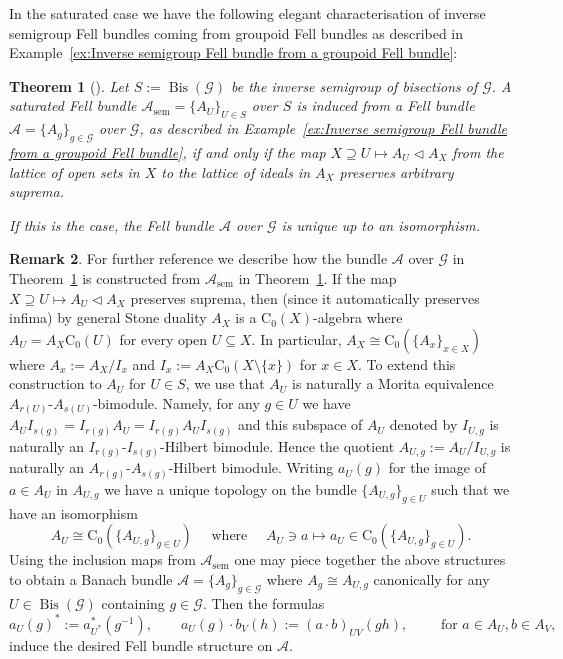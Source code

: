 \documentclass[11 pt, leqno]{amsart}
\numberwithin{equation}{section}
\theoremstyle{plain}
\newtheorem{thm}{Theorem}[section]
\theoremstyle{definition}
\newtheorem {rem} [thm]{Remark}
\newcommand*{\contz}{\mathrm{C_0}}%
\renewcommand{\star}{*}
\DeclareMathOperator{\sem}{sem}
\DeclareMathOperator{\Bis}{Bis}
\newcommand{\G}{\mathcal G} %
\newcommand{\A}{\mathcal A}
\begin{document}
In the saturated case we have the following elegant characterisation of inverse semigroup Fell bundles coming from groupoid Fell bundles as described in Example~\ref{ex:Inverse semigroup Fell bundle from a groupoid Fell bundle}:

\begin{thm}[{\cite[Theorem 6.1]{BussMeyer}}] \label{thm:groupoid_Fell_bundle_from_inverse_semigroup_Fell_bundle}
Let $S:=\Bis(\G)$ be the inverse semigroup of bisections of $\G$.
A saturated Fell bundle $\A_{\sem}=\{A_U\}_{U\in S}$ over $S$ is induced from a Fell bundle $\A=\{A_{g}\}_{g\in \G}$ over $\G$, as described in Example~\ref{ex:Inverse semigroup Fell bundle from a groupoid Fell bundle}, if and only if the map $X\supseteq U\mapsto A_{U} \triangleleft A_X$ from the lattice of open sets in $X$ to the lattice  of ideals in $A_X$ preserves arbitrary suprema.

If this is the case, the Fell bundle $\A$ over $\G$ is unique up to an isomorphism.
\end{thm}

\begin{rem}\label{rem:Buss_Meyer_theorem_bundle_description} 
For further reference we describe how the bundle $\A$ over $\G$ in Theorem~\ref{thm:groupoid_Fell_bundle_from_inverse_semigroup_Fell_bundle} is constructed from $\A_{\sem}$ in Theorem~\ref{thm:groupoid_Fell_bundle_from_inverse_semigroup_Fell_bundle}. 
If the map $X\supseteq U\mapsto A_{U} \triangleleft A_X$ preserves suprema, then (since it automatically preserves infima) by general Stone duality $A_X$ is a $\contz(X)$-algebra where $A_U= A_X \contz(U)$ for every open $U\subseteq X$.
In particular, $A_X\cong \contz(\{A_x\}_{x\in X})$ where $A_x:=A_X/I_x$ and  $I_x:=A_X \contz(X\setminus \{x\})$ for $x\in X$.
To extend this construction to  $A_U$ for $U\in S$, we use that $A_U$ is naturally a Morita equivalence $A_{r(U)}$-$A_{s(U)}$-bimodule. 
Namely, for any $g\in U$ we have $A_{U}I_{ s(g)}=I_{r(g)}A_{U}=I_{r(g)}A_{U}I_{ s(g)}$ and this subspace of $A_{U}$ denoted by $I_{U,g}$ is naturally an $I_{r(g)}$-$I_{s(g)}$-Hilbert bimodule.
Hence  the quotient $A_{U,g}:=A_{U}/I_{U,g}$ is naturally an $A_{r(g)}$-$A_{s(g)}$-Hilbert bimodule. 
Writing $a_{U}(g)$ for the image of $a\in A_U$ in $A_{U,g}$ we have a unique topology on the bundle $\{A_{U,g}\}_{g\in U}$ such that we have an isomorphism
\[
    A_{U}\cong \contz(\{A_{U,g}\}_{g\in U})\quad \text{ where }\quad A_U\ni a\longmapsto a_{U}\in \contz(\{A_{U,g}\}_{g\in U}).
\]
Using the inclusion maps from $\A_{\sem}$ one may piece together the above structures to obtain a Banach bundle $\A=\{A_g\}_{g\in \G}$ where $A_g\cong A_{U,g}$ canonically for any $U\in \Bis(\G)$ containing $g\in \G$. 
Then the formulas 
\[
    a_{U}(g)^{\star}:=a^*_{U^*}(g^{-1}), \qquad 
    a_{U}(g)\cdot b_{V}(h):= (a\cdot b)_{UV}(gh),\qquad \text{ for }a\in A_U, b\in A_{V},
\]
induce the desired Fell bundle structure on $\A$.
\end{rem}
\end{document}

